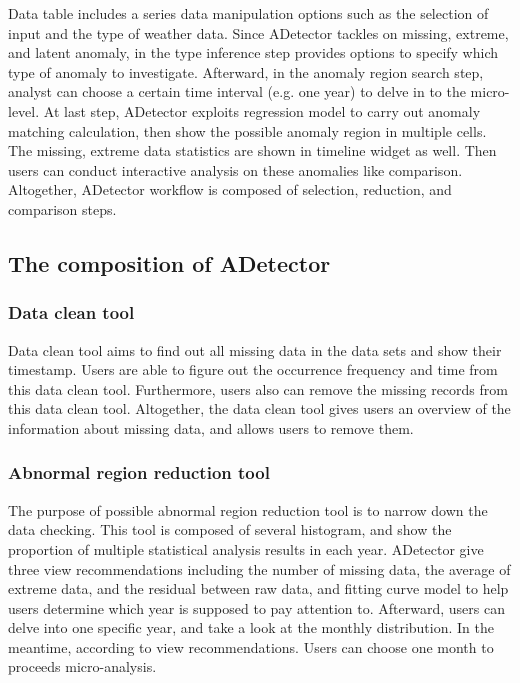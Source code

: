 \documentclass{vgtc}                          %
\begin{document}
Data table includes a series data manipulation options such as the selection of input and the type of weather data. Since ADetector tackles on missing, extreme, and latent anomaly, in the type inference step provides options to specify which type of anomaly to investigate. Afterward, in the anomaly region search step, analyst can choose a certain time interval (e.g. one year) to delve in to the micro-level. At last step, ADetector exploits regression model to carry out anomaly matching calculation, then show the possible anomaly region in multiple cells. The missing, extreme data statistics are shown in timeline widget as well. Then users can conduct interactive analysis on these anomalies like comparison. Altogether, ADetector workflow is composed of selection, reduction, and comparison steps.

\subsection{The composition of ADetector}
\subsubsection{Data clean tool}

Data clean tool aims to find out all missing data in the data sets and show their timestamp. Users are able to figure out the occurrence frequency and time from this data clean tool. Furthermore, users also can remove the missing records from this data clean tool. Altogether, the data clean tool gives users an overview of the information about missing data, and allows users to remove them. 

\subsubsection{Abnormal region reduction tool}

The purpose of possible abnormal region reduction tool is to narrow down the data checking. This tool is composed of several histogram, and show the proportion of multiple statistical analysis results in each year. ADetector give three view recommendations including the number of missing data, the average of extreme data, and the residual between raw data, and fitting curve model to help users determine which year is supposed to pay attention to. Afterward, users can delve into one specific year, and take a look at the monthly distribution. In the meantime, according to view recommendations. Users can choose one month to proceeds micro-analysis.
\end{document}
